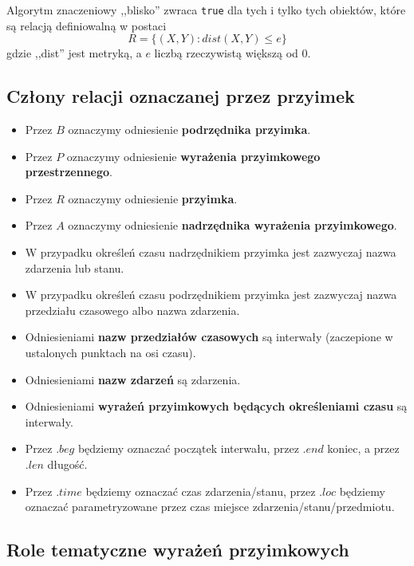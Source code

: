 \documentclass[a4paper, 12pt]{article}
\theoremstyle{remark}
\begin{document}
Algorytm znaczeniowy ,,blisko'' zwraca \texttt{true} dla tych i tylko tych obiektów, które są relacją definiowalną w postaci 
\begin{equation}\label{alg_dla_blisko}
R=\{(X,Y):dist(X,Y) \leq e\}
\end{equation}
 gdzie ,,dist'' jest metryką, a $e$ liczbą rzeczywistą większą od 0.


\subsection{Człony relacji oznaczanej przez przyimek} %
\label{sub:czlony_relacji_oznaczanej_przez_przyimek}

\begin{itemize}
\item Przez $B$ oznaczymy odniesienie \textbf{podrzędnika przyimka}.
\item Przez $P$ oznaczymy odniesienie \textbf{wyrażenia przyimkowego przestrzennego}.
\item Przez $R$ oznaczymy odniesienie \textbf{przyimka}.
\item Przez $A$ oznaczymy odniesienie \textbf{nadrzędnika wyrażenia przyimkowego}.
\item W przypadku określeń czasu nadrzędnikiem przyimka jest zazwyczaj nazwa zdarzenia lub stanu.
\item W przypadku określeń czasu podrzędnikiem przyimka jest zazwyczaj nazwa przedziału czasowego albo nazwa zdarzenia.
\item Odniesieniami \textbf{nazw przedziałów czasowych }są interwały (zaczepione w ustalonych punktach na osi czasu). 
\item Odniesieniami \textbf{nazw zdarzeń }są zdarzenia.
\item Odniesieniami \textbf{wyrażeń przyimkowych będących określeniami czasu }są interwały.
\item Przez $.beg$ będziemy oznaczać początek interwału, przez $.end$ koniec, a przez $.len$ długość.
\item Przez $.time$ będziemy oznaczać czas zdarzenia/stanu, przez $.loc$ będziemy oznaczać parametryzowane przez czas miejsce zdarzenia/stanu/przedmiotu.
\end{itemize}


\subsection{Role tematyczne wyrażeń przyimkowych} %
\label{sub:role_tematyczne_przyimkw_semantycznych}
\end{document}

